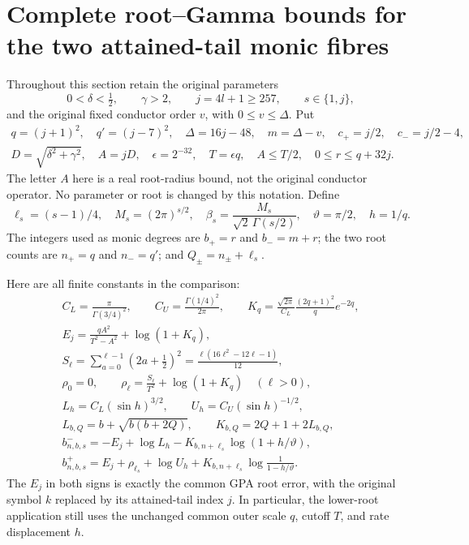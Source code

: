 \documentclass[11pt,a4paper]{article}
\begin{document}

\section{Complete root--Gamma bounds for the two attained-tail monic fibres}
\label{sec:atgpa-audit}

Throughout this section retain the original parameters
\[
 0<\delta<\tfrac12,\qquad \gamma>2,\qquad
 j=4l+1\ge257,\qquad s\in\{1,j\},
\]
and the original fixed conductor order $v$, with
$0\le v\le\Delta$. Put
\[
\begin{gathered}
 q=(j+1)^2,\quad q'=(j-7)^2,\quad
 \Delta=16j-48,\quad m=\Delta-v,\quad
 c_+=j/2,\quad c_-=j/2-4,\\
 D=\sqrt{\delta^2+\gamma^2},\quad A=jD,\quad
 \epsilon=2^{-32},\quad T=\epsilon q,\quad
 A\le T/2,\quad 0\le r\le q+32j.
\end{gathered}\tag{ATG1}
\]
The letter $A$ here is a real root-radius bound, not the original
conductor operator. No parameter or root is changed by this notation.
Define
\[
 \ell_s=(s-1)/4,\quad M_s=(2\pi)^{s/2},\quad
 \beta_s=\frac{M_s}{\sqrt2\,\Gamma(s/2)},\quad
 \vartheta=\pi/2,\quad h=1/q.
\tag{ATG2}
\]
The integers used as monic degrees are $b_+=r$ and $b_-=m+r$;
the two root counts are $n_+=q$ and $n_-=q'$; and
$Q_\pm=n_\pm+\ell_s$.

Here are all finite constants in the comparison:
\[
\begin{gathered}
 C_L=\frac\pi{\Gamma(3/4)^2},\qquad
 C_U=\frac{\Gamma(1/4)^2}{2\pi},\qquad
 K_q=\frac{\sqrt{2\pi}}{C_L}\frac{(2q+1)^2}{q}e^{-2q},\\
 E_j=\frac{q A^2}{T^2-A^2}+\log(1+K_q),\\
 S_\ell=\sum_{a=0}^{\ell-1}(2a+\tfrac12)^2
       =\frac{\ell(16\ell^2-12\ell-1)}{12},\\
 \rho_0=0,\qquad
 \rho_\ell=\frac{S_\ell}{T^2}+\log(1+K_q)\quad(\ell>0),\\
 L_h=C_L(\sin h)^{3/2},\qquad U_h=C_U(\sin h)^{-1/2},\\
 L_{b,Q}=b+\sqrt{b(b+2Q)},\qquad
 K_{b,Q}=2Q+1+2L_{b,Q},\\
 b^-_{n,b,s}=-E_j+\log L_h
              -K_{b,n+\ell_s}\log(1+h/\vartheta),\\
 b^+_{n,b,s}=E_j+\rho_{\ell_s}+\log U_h
              +K_{b,n+\ell_s}\log\frac1{1-h/\vartheta}.
\end{gathered}\tag{ATG3}
\]
The $E_j$ in both signs is exactly the common GPA root error, with
the original symbol $k$ replaced by its attained-tail index $j$.
In particular, the lower-root application still uses the unchanged
common outer scale $q$, cutoff $T$, and rate displacement $h$.
\end{document}
